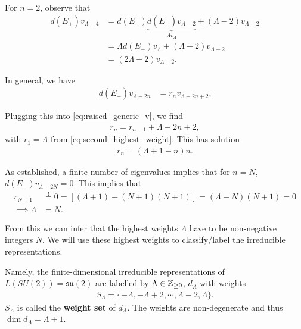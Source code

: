 For $n = 2$, observe that
\begin{align}
    d \left( E_+ \right) v_{\Lambda - 4} &= d\left( E_- \right) \underbrace{d\left( E_+ \right) v_{\Lambda-2}}_{\Lambda v_\Lambda} + \left( \Lambda - 2 \right) v_{\Lambda - 2} \\
    &= \Lambda d \left( E_- \right) v_{\Lambda} + \left( \Lambda - 2 \right) v_{\Lambda - 2}  \ \\
    &= \left( 2 \Lambda - 2 \right) v_{\Lambda - 2}
.\end{align}

In general, we have
\begin{align}
    d \left( E_+ \right)  v_{\Lambda - 2n} &= r_n v_{\Lambda - 2n + 2}
.\end{align}

Plugging this into \cref{eq:raised_generic_v}, we find
\begin{align}
    r_n = r_{n-1} + \Lambda  - 2n + 2
,\end{align}
with $r_1 = \Lambda$ from \cref{eq:second_highest_weight}. This has solution
\begin{align}
    r_n = \left( \Lambda + 1 - n \right) n
.\end{align}

As established, a finite number of eigenvalues implies that for $n = N$, $d \left( E_- \right) v_{\Lambda - 2N} = 0 $. This implies that
\begin{align}
    r_{N+1} &\overset{!}{=} 0 = \left[ \left( \Lambda + 1 \right)  - \left( N + 1 \right) \left( N + 1 \right) \right]  = \left( \Lambda - N \right) \left( N + 1 \right) = 0 \\
    \implies \Lambda &= N
.\end{align}

\begin{note}
    From this we can infer that the highest weights $\Lambda$ have to be non-negative integers $N$. We will use these highest weights to classify/label the irreducible representations.

    Namely, the finite-dimensional irreducible representations of $L \left( SU \left( 2 \right)  \right) = \mathfrak{su}\left( 2 \right) $ are labelled by $\Lambda \in \mathbb{Z}_{\geq 0}$, $d_{\Lambda}$ with weights
    \begin{align}
        S_\Lambda = \{-\Lambda, - \Lambda+2, \cdots, \Lambda - 2, \Lambda\} 
    .\end{align}
    $S_{\Lambda}$ is called the \textbf{weight set} of $d_{\Lambda}$. The weights are non-degenerate and thus $\dim d_{\Lambda} = \Lambda + 1$.
\end{note}

